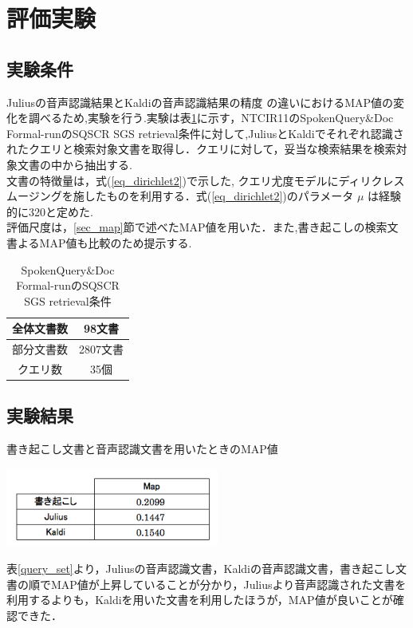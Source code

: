 \section{評価実験}
\subsection{実験条件}
Juliusの音声認識結果とKaldiの音声認識結果の精度
の違いにおけるMAP値の変化を調べるため,実験を行う.実験は表\ref{t_condition}に示す，NTCIR11のSpokenQuery\&Doc Formal-runのSQSCR SGS retrieval条件に対して,JuliusとKaldiでそれぞれ認識されたクエリと検索対象文書を取得し．クエリに対して，妥当な検索結果を検索対象文書の中から抽出する. \\文書の特徴量は，式(\ref{eq_dirichlet2})で示した, クエリ尤度モデルにディリクレスムージングを施したものを利用する．式(\ref{eq_dirichlet2})のパラメータ $\mu$ は経験的に320と定めた. \\ 
評価尺度は，\ref{sec_map}節で述べたMAP値を用いた．また,書き起こしの検索文書よるMAP値も比較のため提示する.

\begin{table}[htbp]
    \begin{center}
        \caption{SpokenQuery\&Doc Formal-runのSQSCR SGS retrieval条件}
        \begin{tabular}{|c|c|}
            \hline
            全体文書数 & 98文書 \\ \hline
            部分文書数 & 2807文書 \\ \hline
            クエリ数 & 35個 \\ \hline
        \end{tabular}
        \label{t_condition}
    \end{center}
\end{table}

\subsection{実験結果}

\begin{table}[htbp]
    \centering
    \caption{書き起こし文書と音声認識文書を用いたときのMAP値}
    \includegraphics[width=7cm]{./image/write_julius_kaldi.png}
    \label{query_set}
\end{table}

表\ref{query_set}より，Juliusの音声認識文書，Kaldiの音声認識文書，書き起こし文書の順でMAP値が上昇していることが分かり，Juliusより音声認識された文書を利用するよりも，Kaldiを用いた文書を利用したほうが，MAP値が良いことが確認できた．



